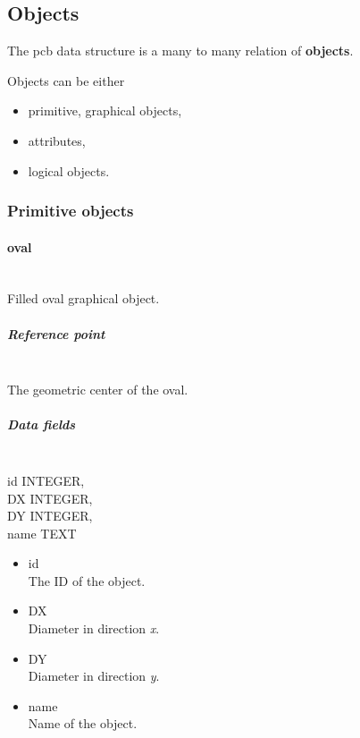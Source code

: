 \documentclass[12pt]{article}
\begin{document}
\subsection{Objects}\label{objects}

The pcb data structure is a many to many relation of \textbf{objects}.

Objects can be either

\begin{itemize}
\item
  primitive, graphical objects,
\item
  attributes,
\item
  logical objects.
\end{itemize}

\subsubsection{Primitive objects}\label{primitive-objects}

\paragraph{oval}\label{oval}

\mbox{}\\

Filled oval graphical object.

\subparagraph{Reference point}\label{reference-point}

\mbox{}\\

The geometric center of the oval.

\subparagraph{Data fields}\label{data-fields}

\mbox{}\\

id INTEGER,\\
DX INTEGER,\\
DY INTEGER,\\
name TEXT

\begin{itemize}
\item
  id\\The ID of the object.
\item
  DX\\Diameter in direction \emph{x}.
\item
  DY\\Diameter in direction \emph{y}.
\item
  name\\Name of the object.
\end{itemize}
\end{document}
